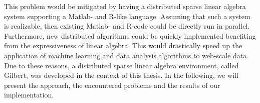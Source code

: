 This problem would be mitigated by having a distributed sparse linear algebra system supporting a Matlab- and R-like language.
Assuming that such a system is realizable, then existing Matlab- and R-code could be directly run in parallel.
Furthermore, new distributed algorithms could be quickly implemented benefiting from the expressiveness of linear algebra.
This would drastically speed up the application of machine learning and data analysis algorithms to web-scale data.
Due to these reasons, a distributed sparse linear algebra environment, called Gilbert, was developed in the context of this thesis.
In the following, we will present the approach, the encountered problems and the results of our implementation.